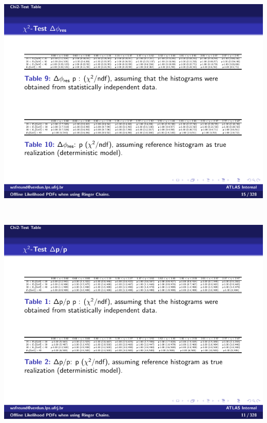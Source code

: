 \begin{table}[t]\ContinuedFloat\addtocounter{table}{-1}%
\begin{subtable}{\textwidth}
\caption{\deltaphires{}\label{tab:gof_chi2_p_values_deltaphi}}
\includegraphics[width=\textwidth]{appendices/figures/gof/deltaphi_chi2_table}
\end{subtable} \\
\begin{subtable}{\textwidth}
\caption{\deltapoverp{}\label{tab:gof_chi2_p_values_poverp}}
\includegraphics[width=\textwidth]{appendices/figures/gof/deltapoverp_chi2_table.pdf}
\end{subtable} \\
\begin{subtable}{\textwidth}

\end{subtable}
\end{table}
